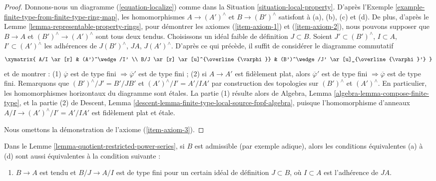 \begin{proof}
\medskip\noindent
Donnons-nous un diagramme (\ref{equation-localize}) comme dans la
Situation \ref{situation-local-property}.
D'après l'Exemple \ref{example-finite-type-from-finite-type-ring-map},
les homomorphismes $A \to (A')^\wedge$ et $B \to (B')^\wedge$
satisfont à (a), (b), (c) et (d). De plus, d'après le
Lemme \ref{lemma-representable-property-rings},
pour démontrer les axiomes (\ref{item-axiom-1}) et (\ref{item-axiom-2}),
nous pouvons supposer que $B \to A$ et $(B')^\wedge \to (A')^\wedge$
sont tous deux tendus. Choisissons un idéal faible de définition $J \subset B$. Soient
$J' \subset (B')^\wedge$, $I \subset A$, $I' \subset (A')^\wedge$
les adhérences de $J(B')^\wedge$, $JA$, $J(A')^\wedge$.
D'après ce qui précède, il suffit de considérer le
diagramme commutatif
$$
\xymatrix{
A/I \ar[r] & (A')^\wedge/I' \\
B/J \ar[r] \ar[u]^{\overline{\varphi}} &
(B')^\wedge/J' \ar[u]_{\overline{\varphi}'}
}
$$
et de montrer : (1) $\overline{\varphi}$ est de type fini
$\Rightarrow \overline{\varphi}'$ est de type fini ; (2) si
$A \to A'$ est fidèlement plat, alors
$\overline{\varphi}'$ est de type fini $\Rightarrow \overline{\varphi}$
est de type fini. Remarquons que $(B')^\wedge/J' = B'/JB'$ et
$(A')^\wedge/I' = A'/IA'$ par construction des topologies sur
$(B')^\wedge$ et $(A')^\wedge$. En particulier, les homomorphismes horizontaux
du diagramme sont étales. La partie (1) résulte alors de
Algebra, Lemma \ref{algebra-lemma-compose-finite-type},
et la partie (2) de
Descent, Lemma \ref{descent-lemma-finite-type-local-source-fppf-algebra},
puisque l'homomorphisme d'anneaux $A/I \to (A')^\wedge/I' = A'/IA'$ est fidèlement plat
et étale.

\medskip\noindent
Nous omettons la démonstration de l'axiome (\ref{item-axiom-3}).
\end{proof}

\begin{lemma}
\label{lemma-quotient-restricted-power-series-admissible}
Dans le Lemme \ref{lemma-quotient-restricted-power-series},
si $B$ est admissible (par exemple adique), alors les conditions équivalentes
(a) à (d) sont aussi équivalentes à la condition suivante :
\begin{enumerate}
\item[(e)] $B \to A$ est tendu et $B/J \to A/I$ est de type fini pour
un certain idéal de définition $J \subset B$, où $I \subset A$ est
l'adhérence de $JA$.
\end{enumerate}
\end{lemma}

